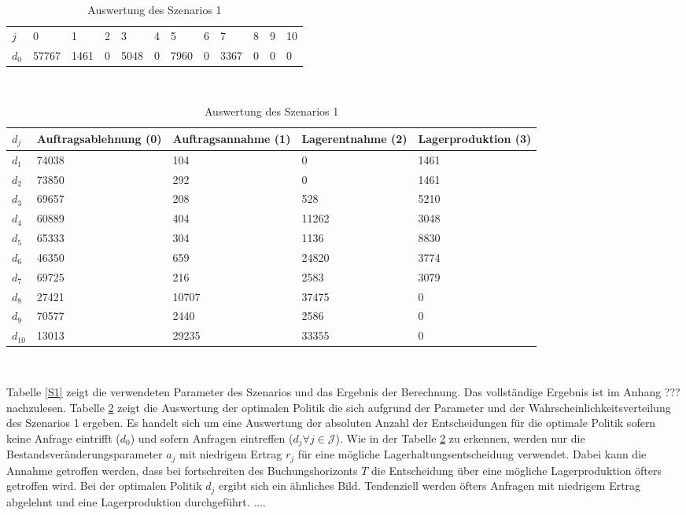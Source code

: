 \begin{table}[h!]
\renewcommand{\arraystretch}{1.5}
  \begin{center}
    \caption{Auswertung des Szenarios 1}  \label{AS1}
    \vspace*{3mm}
    \begin{tabular}{l l l l l l l l l l l l }  \hline 
         $j$ & 0 & 1  & 2 & 3 & 4  & 5 & 6 & 7 & 8 & 9 & 10  \\  
$d_{0}$ &  57767 &  1461 &  0 &  5048 &  0 &  7960 &  0 &  3367 &  0 &  0 &  0 \\
\hline
    \end{tabular} \\[3mm]
        \begin{tabular}{ l p{2.5cm} p{2.5cm} p{2.5cm} p{2.5cm} }   \hline    %
    $d_j$ & Auftrags\-ablehnung (0) & Auftrags\-annahme (1)  & Lager\-entnahme (2) & Lager\-produktion (3)\\\hline 
$d_{1}$  &  74038 &    104 &    0 &  1461 \\
$d_{2}$  &  73850 &    292 &    0 &  1461 \\
$d_{3}$  &  69657 &    208 &    528 &  5210 \\
$d_{4}$  &  60889 &    404 &  11262 &  3048 \\
$d_{5}$  &  65333 &    304 &   1136 &  8830 \\
$d_{6}$  &  46350 &    659 &  24820 &  3774 \\
$d_{7}$  &  69725 &    216 &   2583 &  3079 \\
$d_{8}$  &  27421 &  10707 &  37475 &   0 \\
$d_{9}$  &  70577 &   2440 &   2586 &   0 \\
$d_{10}$ &  13013 &  29235 &  33355 &   0 \\
          \hline
   \end{tabular} \\[3mm]
     \end{center}
\end{table}

Tabelle \ref{S1} zeigt die verwendeten Parameter des Szenarios und das Ergebnis der Berechnung. Das vollständige Ergebnis ist im Anhang ??? nachzulesen. Tabelle \ref{AS1} zeigt die Auswertung der optimalen Politik die sich aufgrund der Parameter und der Wahrscheinlichkeitsverteilung des Szenarios 1 ergeben. Es handelt sich um eine Auswertung der absoluten Anzahl der Entscheidungen für die optimale Politik sofern keine Anfrage eintrifft ($d_0$) und sofern Anfragen eintreffen ($d_j\forall j \in\mathcal{J}$). Wie in der Tabelle \ref{AS1} zu erkennen, werden nur die Bestandsveränderungsparameter $a_j$ mit niedrigem Ertrag $r_j$ für eine mögliche Lagerhaltungsentscheidung verwendet. Dabei kann die Annahme getroffen werden, dass bei fortschreiten des Buchungshorizonts $T$ die Entscheidung über eine mögliche Lagerproduktion öfters getroffen wird. Bei der optimalen Politik $d_j$ ergibt sich ein ähnliches Bild. Tendenziell werden öfters Anfragen mit niedrigem Ertrag abgelehnt und eine Lagerproduktion durchgeführt. ....


